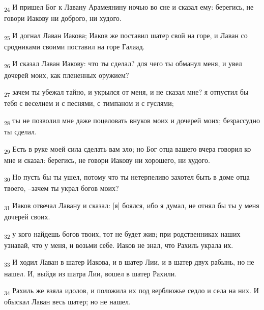 \begin{tcolorbox}
\textsubscript{24} И пришел Бог к Лавану Арамеянину ночью во сне и сказал ему: берегись, не говори Иакову ни доброго, ни худого.
\end{tcolorbox}
\begin{tcolorbox}
\textsubscript{25} И догнал Лаван Иакова; Иаков же поставил шатер свой на горе, и Лаван со сродниками своими поставил на горе Галаад.
\end{tcolorbox}
\begin{tcolorbox}
\textsubscript{26} И сказал Лаван Иакову: что ты сделал? для чего ты обманул меня, и увел дочерей моих, как плененных оружием?
\end{tcolorbox}
\begin{tcolorbox}
\textsubscript{27} зачем ты убежал тайно, и укрылся от меня, и не сказал мне? я отпустил бы тебя с веселием и с песнями, с тимпаном и с гуслями;
\end{tcolorbox}
\begin{tcolorbox}
\textsubscript{28} ты не позволил мне даже поцеловать внуков моих и дочерей моих; безрассудно ты сделал.
\end{tcolorbox}
\begin{tcolorbox}
\textsubscript{29} Есть в руке моей сила сделать вам зло; но Бог отца вашего вчера говорил ко мне и сказал: берегись, не говори Иакову ни хорошего, ни худого.
\end{tcolorbox}
\begin{tcolorbox}
\textsubscript{30} Но пусть бы ты ушел, потому что ты нетерпеливо захотел быть в доме отца твоего, --зачем ты украл богов моих?
\end{tcolorbox}
\begin{tcolorbox}
\textsubscript{31} Иаков отвечал Лавану и сказал: [я] боялся, ибо я думал, не отнял бы ты у меня дочерей своих.
\end{tcolorbox}
\begin{tcolorbox}
\textsubscript{32} у кого найдешь богов твоих, тот не будет жив; при родственниках наших узнавай, что у меня, и возьми себе. Иаков не знал, что Рахиль украла их.
\end{tcolorbox}
\begin{tcolorbox}
\textsubscript{33} И ходил Лаван в шатер Иакова, и в шатер Лии, и в шатер двух рабынь, но не нашел. И, выйдя из шатра Лии, вошел в шатер Рахили.
\end{tcolorbox}
\begin{tcolorbox}
\textsubscript{34} Рахиль же взяла идолов, и положила их под верблюжье седло и села на них. И обыскал Лаван весь шатер; но не нашел.
\end{tcolorbox}
